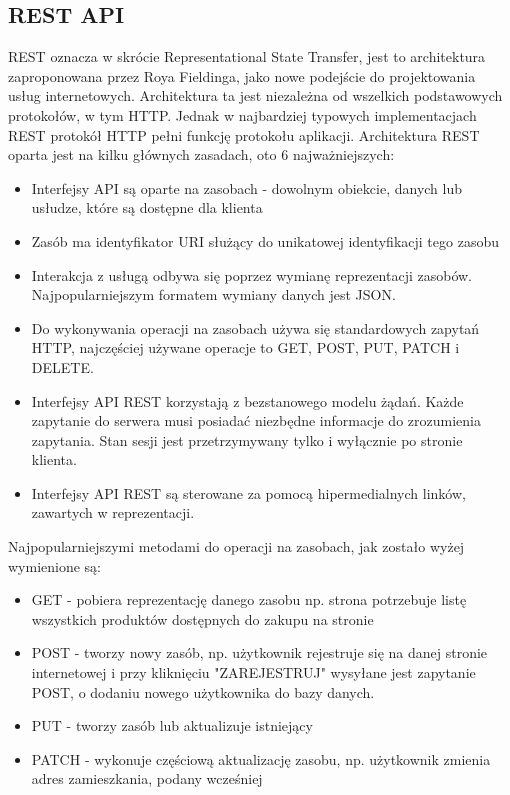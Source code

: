 \documentclass[12pt]{article}
\begin{document}
\begin{sloppypar}
{  \subsection{REST API}
  {
    REST oznacza w skrócie Representational State Transfer, jest to architektura zaproponowana przez Roya Fieldinga, jako nowe podejście do projektowania 
    usług internetowych. Architektura ta jest niezależna od wszelkich podstawowych protokołów, w tym HTTP. Jednak w najbardziej typowych implementacjach REST 
    protokół HTTP pełni funkcję protokołu aplikacji.\cite{mc-rest}
    Architektura REST oparta jest na kilku głównych zasadach, oto 6 najważniejszych\cite{mc-rest}:
    \begin{itemize}
      \item Interfejsy API są oparte na zasobach - dowolnym obiekcie, danych lub usłudze, które są dostępne dla klienta
      \item Zasób ma identyfikator URI służący do unikatowej identyfikacji tego zasobu
      \item Interakcja z usługą odbywa się poprzez wymianę reprezentacji zasobów. Najpopularniejszym formatem wymiany danych jest JSON.
      \item Do wykonywania operacji na zasobach używa się standardowych zapytań HTTP, najczęściej używane operacje to GET, POST, PUT, PATCH i DELETE.
      \item Interfejsy API REST korzystają z bezstanowego modelu żądań. Każde zapytanie do serwera musi posiadać niezbędne informacje do zrozumienia zapytania. Stan sesji jest przetrzymywany tylko i wyłącznie po stronie klienta.
      \item Interfejsy API REST są sterowane za pomocą hipermedialnych linków, zawartych w reprezentacji.
    \end{itemize}
    Najpopularniejszymi metodami do operacji na zasobach, jak zostało wyżej wymienione są:
    \begin{itemize}
      \item GET - pobiera reprezentację danego zasobu np. strona potrzebuje listę wszystkich produktów dostępnych do zakupu na stronie
      \item POST - tworzy nowy zasób, np. użytkownik rejestruje się na danej stronie internetowej i przy kliknięciu "ZAREJESTRUJ" wysyłane jest zapytanie POST, o dodaniu nowego użytkownika do bazy danych.
      \item PUT - tworzy zasób lub aktualizuje istniejący
      \item PATCH - wykonuje częściową aktualizację zasobu, np. użytkownik zmienia adres zamieszkania, podany wcześniej

\end{itemize}}}
\end{sloppypar}
\end{document}
